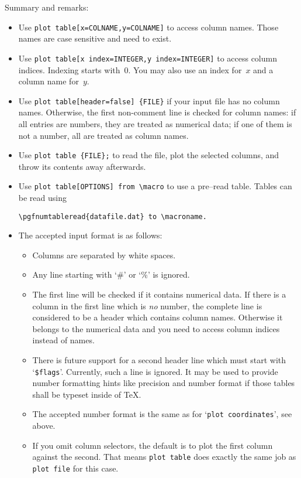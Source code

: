 Summary and remarks:
\begin{itemize}
	\item Use \texttt{plot table[x=COLNAME,y=COLNAME]} to access column names. Those names are case sensitive and need to exist.
	\item Use \texttt{plot table[x index=INTEGER,y index=INTEGER]} to access column indices. Indexing starts with~$0$. You may also use an index for~$x$ and a column name for~$y$.
	\item Use \lstinline!plot table[header=false] {FILE}! if your input file has no column names. Otherwise, the first non-comment line is checked for column names: if all entries are numbers, they are treated as numerical data; if one of them is not a number, all are treated as column names.
	\item Use \lstinline!plot table {FILE};! to read the file, plot the selected columns, and throw its contents away afterwards.
	\item Use \lstinline!plot table[OPTIONS] from \macro! to use a pre--read table. Tables can be read using
\begin{lstlisting}
\pgfnumtableread{datafile.dat} to \macroname.
\end{lstlisting}
	\item The accepted input format is as follows:
		\begin{itemize}
			\item Columns are separated by white spaces.
			\item Any line starting with `\#' or `\%' is ignored.
			\item The first line will be checked if it contains numerical data. If there is a column in the first line which is \emph{no} number, the complete line is considered to be a header which contains column names. Otherwise it belongs to the numerical data and you need to access column indices instead of names.

			\item There is future support for a second header line which must start with `\texttt{\$flags}'. Currently, such a line is ignored. It may be used to provide number formatting hints like precision and number format if those tables shall be typeset inside of \TeX.
			\item The accepted number format is the same as for `\texttt{plot coordinates}', see above.
			\item If you omit column selectors, the default is to plot the first column against the second. That means \texttt{plot table} does exactly the same job as \texttt{plot file} for this case.
		\end{itemize}
\end{itemize}

